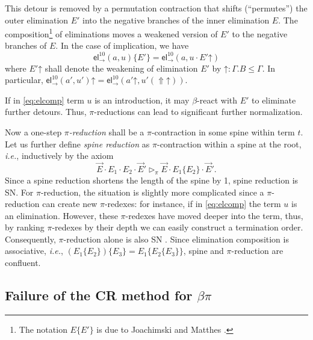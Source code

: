 \documentclass[a4paper,USenglish,cleveref, autoref, thm-restate]{lipics-v2019}
\newcommand{\ie}{\emph{i.e.}\xspace}
\newcommand{\tel}{\mathsf{el}}
\newcommand{\el}[2]{\ensuremath{\tel_{#1}^{#2}}}
\newcommand{\contract}[1][]{\mapsto_{#1}}
\newcommand{\whd}[1][]{\rhd_{#1}}
\newcommand{\red}[1][]{\longrightarrow_{#1}}
\newcommand{\Up}{\mathop{\Uparrow}}
\newcommand{\up}{\mathord{\uparrow}}
\begin{document}
This detour is removed by a permutation contraction
\fbox{$E \cdot E' \contract[\pi] E\{E'\}$} that shifts (``permutes'')
the outer elimination
$E'$ into the negative branches of the inner elimination $E$.
The composition\footnote{The notation $E\{E'\}$ is due to Joachimski
  and Matthes \cite{joachimskiMatthes:rta00}.}
 of eliminations moves a weakened
version of $E'$ to the negative branches of $E$.  In the case of
implication, we have
\begin{equation}
  \label{eq:elcomp}
  \el\to{10}(a,u) \{ E' \} = \el\to{10}(a,u \cdot E' \up)
\end{equation}
where
$E' \up$ shall denote the weakening of elimination $E'$ by
$\up : \Gamma.B \leq \Gamma$.
In particular, $\el\to{10}(a',u') \up = \el\to{10}(a' \up, u' (\Up\up))$.

\begin{remark}
  If in \cref{eq:elcomp} term $u$ is an introduction, it may $\beta$-react
  with $E'$ to eliminate further detours.  Thus, $\pi$-reductions can
  lead to significant further normalization.
\end{remark}

Now a one-step \emph{$\pi$-reduction} \fbox{$t \red[\pi] t'$} shall be a
$\pi$-contraction in some spine within term $t$.
%
Let us further define \emph{spine reduction} \fbox{$\vec E \whd[\pi] \vec E'$}
as $\pi$-contraction within a spine at the root, \ie, inductively
by the axiom
\[
  \vec E \cdot E_1 \cdot E_2 \cdot \vec E'
  \whd[\pi]
 \vec E \cdot E_1\{E_2\} \cdot \vec E'
 .
\]
Since a spine reduction shortens the length
of the spine by 1, spine reduction is SN.  For $\pi$-reduction, the
situation is slightly more complicated since a $\pi$-reduction can
create new $\pi$-redexes: for instance, if in \cref{eq:elcomp} the
term $u$ is an elimination.  However, these $\pi$-redexes have moved
deeper into the term, thus, by ranking $\pi$-redexes by their depth we
can easily construct a termination order.  Consequently,
$\pi$-reduction alone is also SN \cite[Thm.~55]{geuversHurkens:types17}.
%
Since elimination composition is associative, \ie,
$(E_1\{E_2\})\{E_3\} = E_1\{E_2\{E_3\}\}$, spine and $\pi$-reduction
are confluent.

\subsection{Failure of the CR method for $\beta\pi$}
\end{document}
